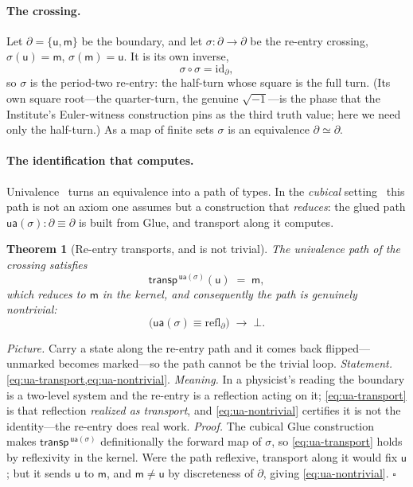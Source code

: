 \documentclass[11pt,letterpaper]{article}
\theoremstyle{plain}
\newtheorem{theorem}{Theorem}[section]
\theoremstyle{definition}
\theoremstyle{remark}
\newcommand{\Bd}{\partial}                              %
\newcommand{\ua}{\mathsf{ua}}                           %
\newcommand{\transport}{\mathsf{transp}}
\newcommand{\unmk}{\mathsf{u}}                          %
\newcommand{\mkd}{\mathsf{m}}                           %
\newcommand{\cross}{\sigma}                             %
\begin{document}
\paragraph{The crossing.}
Let $\Bd=\{\unmk,\mkd\}$ be the boundary, and let $\cross\colon\Bd\to\Bd$ be the
re-entry crossing, $\cross(\unmk)=\mkd$, $\cross(\mkd)=\unmk$. It is its own
inverse,
\begin{equation}\label{eq:cross-involution}
  \cross\circ\cross = \mathrm{id}_{\Bd},
\end{equation}
so $\cross$ is the period-two re-entry: the half-turn whose square is the full
turn. (Its own square root---the quarter-turn, the genuine $\sqrt{-1}$---is the
phase that the Institute's Euler-witness construction pins as the third truth
value; here we need only the half-turn.) As a map of finite sets $\cross$ is an
equivalence $\Bd\simeq\Bd$.

\paragraph{The identification that computes.}
Univalence~\citep{voevodsky2014univalent} turns an equivalence into a path of
types. In the \emph{cubical} setting~\citep{cohen2018cubical,vezzosi2019cubical}
this path is not an axiom one assumes but a construction that \emph{reduces}: the
glued path $\ua(\cross)\colon\Bd\equiv\Bd$ is built from Glue, and transport along
it computes.

\begin{theorem}[Re-entry transports, and is not trivial]\label{thm:ua}
The univalence path of the crossing satisfies
\begin{equation}\label{eq:ua-transport}
  \transport^{\,\ua(\cross)}(\unmk) \;=\; \mkd,
\end{equation}
which reduces to $\mkd$ in the kernel, and consequently the path is genuinely
nontrivial:
\begin{equation}\label{eq:ua-nontrivial}
  \big(\ua(\cross)\equiv\mathrm{refl}_{\Bd}\big)\;\to\;\bot.
\end{equation}
\end{theorem}

\noindent\emph{Picture.} Carry a state along the re-entry path and it comes back
flipped---unmarked becomes marked---so the path cannot be the trivial loop.
\emph{Statement.} \cref{eq:ua-transport,eq:ua-nontrivial}. \emph{Meaning.} In a
physicist's reading the boundary is a two-level system and the re-entry is a
reflection acting on it; \cref{eq:ua-transport} is that reflection \emph{realized
as transport}, and \cref{eq:ua-nontrivial} certifies it is not the identity---the
re-entry does real work. \emph{Proof.} The cubical Glue construction makes
$\transport^{\,\ua(\cross)}$ definitionally the forward map of $\cross$, so
\cref{eq:ua-transport} holds by reflexivity in the kernel. Were the path
reflexive, transport along it would fix $\unmk$; but it sends $\unmk$ to $\mkd$,
and $\mkd\neq\unmk$ by discreteness of $\Bd$, giving \cref{eq:ua-nontrivial}.
\hfill$\square$
\end{document}
